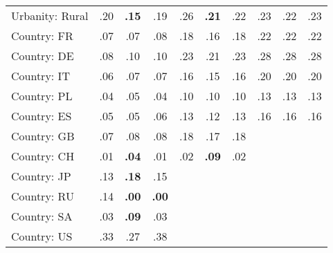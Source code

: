 \begin{tabular}[t]{lccccccccc}
Urbanity: Rural & .20 & \textbf{.15} & .19 & .26 & \textbf{.21} & .22 & .23 & .22 & .23\\
\addlinespace
Country: FR & .07 & .07 & .08 & .18 & .16 & .18 & .22 & .22 & .22\\
Country: DE & .08 & .10 & .10 & .23 & .21 & .23 & .28 & .28 & .28\\
Country: IT & .06 & .07 & .07 & .16 & .15 & .16 & .20 & .20 & .20\\
Country: PL & .04 & .05 & .04 & .10 & .10 & .10 & .13 & .13 & .13\\
Country: ES & .05 & .05 & .06 & .13 & .12 & .13 & .16 & .16 & .16\\
Country: GB & .07 & .08 & .08 & .18 & .17 & .18 &  &  & \\
Country: CH & .01 & \textbf{.04} & .01 & .02 & \textbf{.09} & .02 &  &  & \\
Country: JP & .13 & \textbf{.18} & .15 &  &  &  &  &  & \\
Country: RU & .14 & \textbf{.00} & \textbf{.00} &  &  &  &  &  & \\
Country: SA & .03 & \textbf{.09} & .03 &  &  &  &  &  & \\
Country: US & .33 & .27 & .38 &  &  &  &  &  & \\
\bottomrule
\end{tabular}